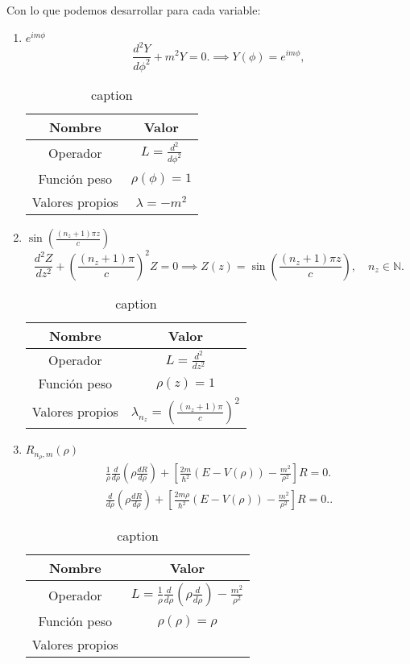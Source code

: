 \documentclass{report}
\begin{document}
Con lo que podemos desarrollar para cada variable:
\begin{enumerate}
  \item \( e^{im\phi} \)
\[
\frac{d^2 Y}{d\phi^2} + m^2 Y = 0. \implies Y(\phi) = e^{im\phi},
\]
\begin{table}[H]
  \centering
  \caption{caption}
  \label{tab:label}
  \begin{tabular}{c|c}
    \hline
    Nombre & Valor\\
    \hline
    Operador & \( L = \frac{d^2}{d\phi^2} \) \\
    Función peso & \( \rho(\phi) = 1 \) \\
    Valores propios & \( \lambda = -m^2 \)\\
    \hline
  \end{tabular}
\end{table}

\item $\sin\left(\frac{(n_z+1)\pi z}{c}\right)$
\[
\frac{d^2Z}{dz^2} + \left(\frac{(n_z+1)\pi}{c}\right)^2 Z = 0 \implies Z(z) = \sin\left(\frac{(n_z+1)\pi z}{c}\right), \quad n_z \in \mathbb{N}.
\]

\begin{table}[H]
  \centering
  \caption{caption}
  \label{tab:label}
  \begin{tabular}{c|c}
    \hline
    Nombre & Valor\\
    \hline
    Operador & \( L = \frac{d^2}{dz^2} \)\\
    Función peso & \( \rho(z) = 1 \)\\
    Valores propios & \( \lambda_{n_z} = \left(\frac{(n_z+1)\pi}{c}\right)^2 \)\\
    \hline
  \end{tabular}
\end{table}

\item $R_{n_\rho, m}\left( \rho \right) $
  \begin{align*}
	\frac{1}{\rho} \frac{d}{d\rho} \left( \rho \frac{dR}{d\rho} \right) + \left[ \frac{2m}{\hbar^2} \left(E - V(\rho)\right) - \frac{m^2}{\rho^2} \right] R = 0.\\
	\frac{d}{d\rho} \left( \rho \frac{dR}{d\rho} \right) + \left[ \frac{2m\rho}{\hbar^2} \left( E - V(\rho) \right) - \frac{m^2}{\rho^2} \right] R = 0.
  .\end{align*}

\begin{table}[H]
  \centering
  \caption{caption}
  \label{tab:label}
  \begin{tabular}{c|c}
    \hline
    Nombre & Valor\\
    \hline
    Operador & \( L = \frac{1}{\rho} \frac{d}{d\rho} \left( \rho \frac{d}{d\rho} \right) - \frac{m^2}{\rho^2} \)\\
    Función peso &  \( \rho(\rho) = \rho \)\\
    Valores propios & \\
    \hline
  \end{tabular}
\end{table}
\end{enumerate}
\end{document}
